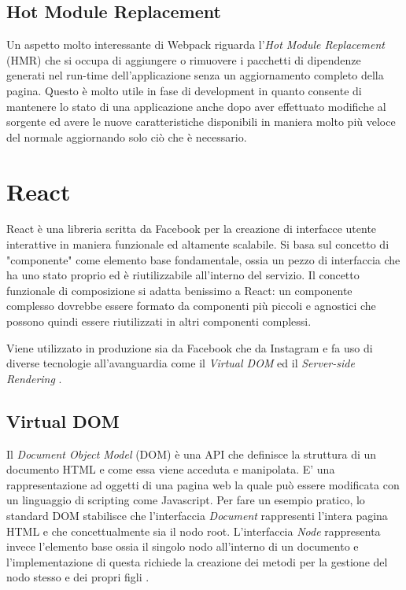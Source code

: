 \subsection{Hot Module Replacement}
Un aspetto molto interessante di Webpack riguarda l'\textit{Hot Module Replacement} (HMR) che si occupa di aggiungere o rimuovere i pacchetti di dipendenze generati nel run-time dell'applicazione senza un aggiornamento completo della pagina. Questo è molto utile in fase di development in quanto consente di mantenere lo stato di una applicazione anche dopo aver effettuato modifiche al sorgente ed avere le nuove caratteristiche disponibili in maniera molto più veloce del normale aggiornando solo ciò che è necessario. 

\section{React}
React è una libreria scritta da Facebook per la creazione di interfacce utente interattive in maniera funzionale ed altamente scalabile. Si basa sul concetto di "componente" come elemento base fondamentale, ossia un pezzo di interfaccia che ha uno stato proprio ed è riutilizzabile all'interno del servizio. Il concetto funzionale di composizione si adatta benissimo a React: un componente complesso dovrebbe essere formato da componenti più piccoli e agnostici che possono quindi essere riutilizzati in altri componenti complessi.

Viene utilizzato in produzione sia da Facebook che da Instagram e fa uso di diverse tecnologie all'avanguardia come il \textit{Virtual DOM} ed il \textit{Server-side Rendering} \cite{WheelerOnReact}.

\subsection{Virtual DOM}
Il  \textit{Document Object Model} (DOM) è una API che definisce la struttura di un documento HTML e come essa viene acceduta e manipolata. E' una rappresentazione ad oggetti di una pagina web la quale può essere modificata con un linguaggio di scripting come Javascript.
Per fare un esempio pratico, lo standard DOM stabilisce che l'interfaccia \textit{Document} rappresenti l'intera pagina HTML e che concettualmente sia il nodo root. L'interfaccia \textit{Node} rappresenta invece l'elemento base ossia il singolo nodo all'interno di un documento e l'implementazione di questa richiede la creazione dei metodi per la gestione del nodo stesso e dei propri figli \cite{HWRWhatIsDOM}.

